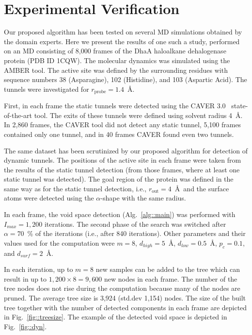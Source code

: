\documentclass[usletter, 10pt, conference]{svjour3}      %
\def\Imax{I_{max}} %
\def\dts{d_{surf}}
\def\da{d_{high}}
\def\db{d_{low}}
\def\probe{r_{\mathrm{probe}}}
\def\gprobe{r_{\mathrm{out}}}
\def\gb{p_{c}}
\begin{document}
\section{Experimental Verification}

Our proposed algorithm has been tested on several MD simulations obtained by the domain experts. 
Here we present the results of one such a study, performed on an MD consisting of 8,000 frames of the DhaA haloalkane dehalogenase protein (PDB ID 1CQW).
The molecular dynamics was simulated using the AMBER tool.
The active site was defined by the surrounding residues with sequence numbers 38 (Asparagine), 102 (Histidine), and 103 (Aspartic Acid).
The tunnels were investigated for $\probe=1.4$~\AA.


First, in each frame the static tunnels were detected using the CAVER 3.0~\cite{caver3} state-of-the-art tool.
The exits of these tunnels were defined using solvent radius 4~\AA.
In 2,860 frames, the CAVER tool did not detect any static tunnel, 5,100 frames contained only one tunnel, and in 40 frames CAVER found even two tunnels.

The same dataset has been scrutinized by our proposed algorithm for detection of dynamic tunnels.
The positions of the active site in each frame were taken from the results of the static tunnel detection (from those frames, where at least
one static tunnel was detected).
The goal region of the protein was defined in the same way as for the static tunnel detection, i.e., $\gprobe=4$~\AA\ and 
the surface atoms were detected using the $\alpha$-shape with the same radius.

In each frame, the void space detection (Alg.~\ref{alg::main}) was performed with $\Imax=1,200$ iterations.
The second phase of the search was switched after $\alpha=70$~\% of the iterations (i.e., after 840 iterations).
Other parameters and their values used for the computation were $m=8$, $\da=5$~\AA, $\db=0.5$~\AA, $\gb=0.1$, and $\dts=2$~\AA.

In each iteration, up to $m=8$ new samples can be added to the tree which can result in up to $1,200 \times 8 = 9,600$ new nodes in each frame. 
The number of the tree nodes does not rise during the computation because many of the nodes are pruned.
The average tree size is 3,924 (std.dev 1,154) nodes.
The size of the built tree together with the number of detected components in each frame are depicted in Fig.~\ref{fig::treesize}.
The example of the detected void space is depicted in Fig.~\ref{fig::dyn}.
\end{document}
